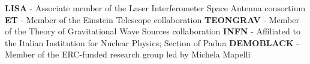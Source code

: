 %
%
%


\begin{singlelines}
					{\textbf{LISA} - Associate member of the Laser Interferometer Space Antenna consortium}	{}
					{\textbf{ET} - Member of the Einstein Telescope collaboration}{}
					{\textbf{TEONGRAV} - Member of the Theory of Gravitational Wave Sources collaboration}{}
					{\textbf{INFN}	- Affiliated to the Italian Institution for Nuclear Physics; Section of Padua}{}
					{\textbf{DEMOBLACK} - Member of the ERC-funded research group led by Michela Mapelli }{}
\end{singlelines}
\medskip